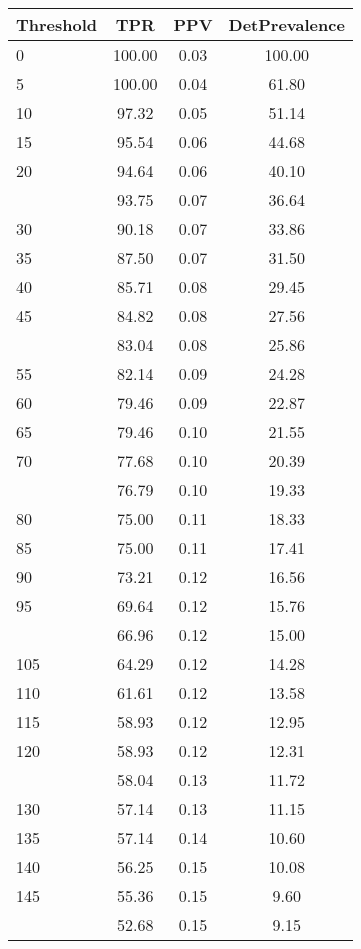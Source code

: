 \begin{table}[ht]
\centering
\begin{tabular}{lccc}
  \toprule
Threshold & TPR & PPV & DetPrevalence \\ 
  \midrule
0 & 100.00 & 0.03 & 100.00 \\ 
  5 & 100.00 & 0.04 & 61.80 \\ 
  10 & 97.32 & 0.05 & 51.14 \\ 
  15 & 95.54 & 0.06 & 44.68 \\ 
  20 & 94.64 & 0.06 & 40.10 \\ 
   \addlinespace
25 & 93.75 & 0.07 & 36.64 \\ 
  30 & 90.18 & 0.07 & 33.86 \\ 
  35 & 87.50 & 0.07 & 31.50 \\ 
  40 & 85.71 & 0.08 & 29.45 \\ 
  45 & 84.82 & 0.08 & 27.56 \\ 
   \addlinespace
50 & 83.04 & 0.08 & 25.86 \\ 
  55 & 82.14 & 0.09 & 24.28 \\ 
  60 & 79.46 & 0.09 & 22.87 \\ 
  65 & 79.46 & 0.10 & 21.55 \\ 
  70 & 77.68 & 0.10 & 20.39 \\ 
   \addlinespace
75 & 76.79 & 0.10 & 19.33 \\ 
  80 & 75.00 & 0.11 & 18.33 \\ 
  85 & 75.00 & 0.11 & 17.41 \\ 
  90 & 73.21 & 0.12 & 16.56 \\ 
  95 & 69.64 & 0.12 & 15.76 \\ 
   \addlinespace
100 & 66.96 & 0.12 & 15.00 \\ 
  105 & 64.29 & 0.12 & 14.28 \\ 
  110 & 61.61 & 0.12 & 13.58 \\ 
  115 & 58.93 & 0.12 & 12.95 \\ 
  120 & 58.93 & 0.12 & 12.31 \\ 
   \addlinespace
125 & 58.04 & 0.13 & 11.72 \\ 
  130 & 57.14 & 0.13 & 11.15 \\ 
  135 & 57.14 & 0.14 & 10.60 \\ 
  140 & 56.25 & 0.15 & 10.08 \\ 
  145 & 55.36 & 0.15 & 9.60 \\ 
   \addlinespace
150 & 52.68 & 0.15 & 9.15 \\ 

\end{tabular}
\end{table}

